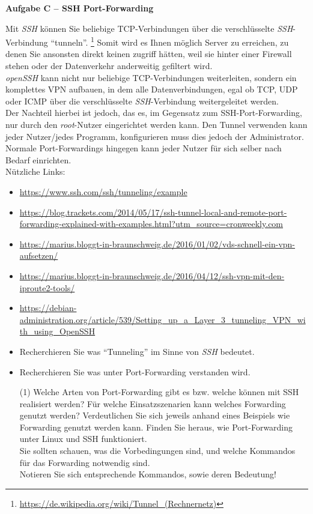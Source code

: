 \documentclass[paper=a4,fontsize=11pt]{scrartcl}%
\begin{document}
\begin{center}\Large{\textbf{Aufgabe C -- SSH Port-Forwarding}}\end{center}\vskip0.25in
Mit \emph{SSH} können Sie beliebige TCP-Verbindungen über die verschlüsselte \emph{SSH}-Verbindung \enquote{tunneln}. \footnote{\url{https://de.wikipedia.org/wiki/Tunnel_(Rechnernetz)}} Somit wird es Ihnen möglich Server zu erreichen, zu denen Sie ansonsten direkt keinen zugriff hätten, weil sie hinter einer Firewall stehen oder der Datenverkehr anderweitig gefiltert wird.\\
\emph{openSSH} kann nicht nur beliebige TCP-Verbindungen weiterleiten, sondern ein komplettes VPN aufbauen, in dem alle Datenverbindungen, egal ob TCP, UDP oder ICMP über die verschlüsselte \emph{SSH}-Verbindung weitergeleitet werden.\\
Der Nachteil hierbei ist jedoch, das es, im Gegensatz zum SSH-Port-Forwarding, nur durch den \emph{root}-Nutzer eingerichtet werden kann. Den Tunnel verwenden kann jeder Nutzer/jedes Programm, konfigurieren muss dies jedoch der Administrator. Normale Port-Forwardings hingegen kann jeder Nutzer für sich selber nach Bedarf einrichten.\\
Nützliche Links:
\begin{itemize}
	\item \url{https://www.ssh.com/ssh/tunneling/example}
	\item \url{https://blog.trackets.com/2014/05/17/ssh-tunnel-local-and-remote-port-forwarding-explained-with-examples.html?utm_source=cronweekly.com}
	\item \url{https://marius.bloggt-in-braunschweig.de/2016/01/02/vds-schnell-ein-vpn-aufsetzen/}
	\item \url{https://marius.bloggt-in-braunschweig.de/2016/04/12/ssh-vpn-mit-den-iproute2-tools/}
	\item \url{https://debian-administration.org/article/539/Setting_up_a_Layer_3_tunneling_VPN_with_using_OpenSSH}
\end{itemize}
\begin{itemize}
	\item Recherchieren Sie was \enquote{Tunneling} im Sinne von \emph{SSH}  bedeutet.
	\item Recherchieren Sie was unter Port-Forwarding verstanden wird.\\
	\begin{tasks}(1)
		\task Welche Arten von Port-Forwarding gibt es bzw. welche können mit SSH realisiert werden? Für welche Einsatzszenarien kann welches Forwarding genutzt werden?
		\task Verdeutlichen Sie sich jeweils anhand eines Beispiels wie Forwarding genutzt werden kann.
		\task Finden Sie heraus, wie Port-Forwarding unter Linux und SSH funktioniert.\\
		Sie sollten schauen, was die Vorbedingungen sind, und welche Kommandos für das Forwarding notwendig sind.\\
		Notieren Sie sich entsprechende Kommandos, sowie deren Bedeutung!
	\end{tasks}
\end{itemize}
\end{document}
